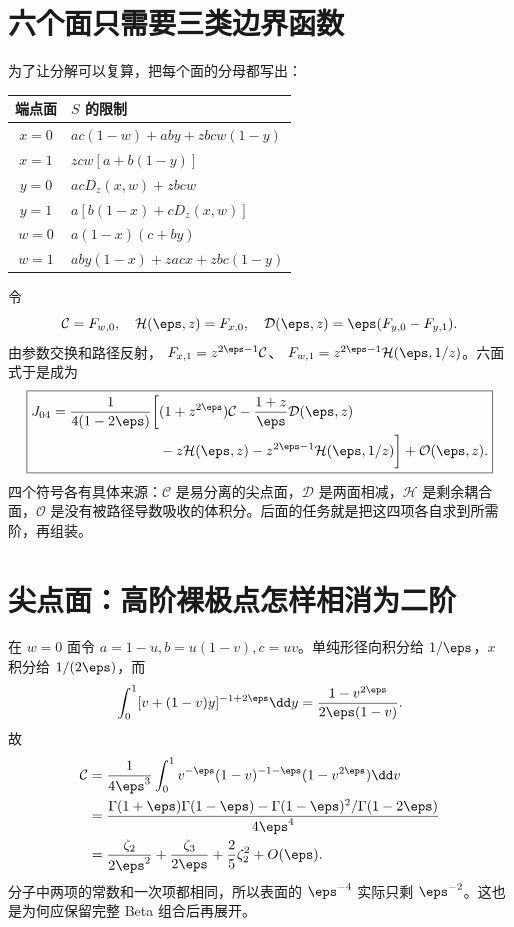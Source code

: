 \section{六个面只需要三类边界函数}
为了让分解可以复算，把每个面的分母都写出：
\begin{center}\small
\begin{tabular}{cl}
\toprule
端点面 & $S$ 的限制\\
\midrule
$x=0$ & $ac(1-w)+aby+zbcw(1-y)$\\[3pt]
$x=1$ & $zcw[a+b(1-y)]$\\[3pt]
$y=0$ & $acD_z(x,w)+zbcw$\\[3pt]
$y=1$ & $a[b(1-x)+cD_z(x,w)]$\\[3pt]
$w=0$ & $a(1-x)(c+by)$\\[3pt]
$w=1$ & $aby(1-x)+zacx+zbc(1-y)$\\
\bottomrule
\end{tabular}
\end{center}
令
\begin{equation}
\mathcal C=F_{w,0},\quad \mathcal H(\eps,z)=F_{x,0},\quad
\mathcal D(\eps,z)=\eps(F_{y,0}-F_{y,1}).
\end{equation}
由参数交换和路径反射，
$F_{x,1}=z^{2\eps-1}\mathcal C$、
$F_{w,1}=z^{2\eps-1}\mathcal H(\eps,1/z)$。六面式于是成为
\begin{equation}
\boxed{\begin{aligned}
J_{04}=\frac1{4(1-2\eps)}\bigg[&(1+z^{2\eps})\mathcal C
-\frac{1+z}{\eps}\mathcal D(\eps,z)\\
&-z\mathcal H(\eps,z)-z^{2\eps-1}\mathcal H(\eps,1/z)\bigg]
+\mathcal O(\eps,z).
\end{aligned}}
\label{eq:04master}
\end{equation}
四个符号各有具体来源：$\mathcal C$ 是易分离的尖点面，$\mathcal D$ 是两面相减，$\mathcal H$ 是剩余耦合面，$\mathcal O$ 是没有被路径导数吸收的体积分。后面的任务就是把这四项各自求到所需阶，再组装。

\section{尖点面：高阶裸极点怎样相消为二阶}
在 $w=0$ 面令 $a=1-u,b=u(1-v),c=uv$。单纯形径向积分给 $1/\eps$，$x$ 积分给 $1/(2\eps)$，而
\[
\int_0^1[v+(1-v)y]^{-1+2\eps}\dd y
=\frac{1-v^{2\eps}}{2\eps(1-v)}.
\]
故
\begin{equation}
\begin{aligned}
\mathcal C
&=\frac1{4\eps^3}\int_0^1 v^{-\eps}(1-v)^{-1-\eps}(1-v^{2\eps})\dd v\\
&=\frac{\Gamma(1+\eps)\Gamma(1-\eps)
-\Gamma(1-\eps)^2/\Gamma(1-2\eps)}{4\eps^4}\\
&=\frac{\zeta_2}{2\eps^2}+\frac{\zeta_3}{2\eps}
+\frac25\zeta_2^2+O(\eps).
\end{aligned}
\label{eq:cusp}
\end{equation}
分子中两项的常数和一次项都相同，所以表面的 $\eps^{-4}$ 实际只剩 $\eps^{-2}$。这也是为何应保留完整 Beta 组合后再展开。

